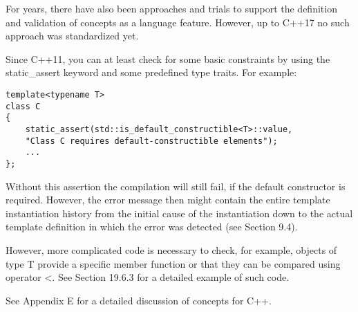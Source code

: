 For years, there have also been approaches and trials to support the definition and validation of concepts as a language feature. However, up to C++17 no such approach was standardized yet.

Since C++11, you can at least check for some basic constraints by using the static\_assert keyword and some predefined type traits. For example:

\begin{lstlisting}[style=styleCXX]
template<typename T>
class C
{
	static_assert(std::is_default_constructible<T>::value,
	"Class C requires default-constructible elements");
	...
};
\end{lstlisting}

Without this assertion the compilation will still fail, if the default constructor is required. However, the error message then might contain the entire template instantiation history from the initial cause of the instantiation down to the actual template definition in which the error was detected (see Section 9.4).

However, more complicated code is necessary to check, for example, objects of type T provide a specific member function or that they can be compared using operator <. See Section 19.6.3 for a detailed example of such code. 

See Appendix E for a detailed discussion of concepts for C++.















